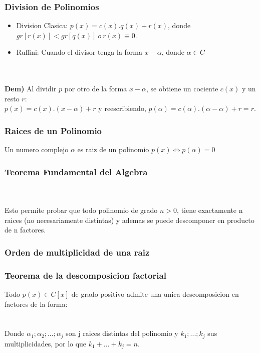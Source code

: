 \documentclass[10pt]{article}
\begin{document}
\subsubsection{Division de Polinomios}
\begin{itemize}
\item Division Clasica: $p(x)=c(x).q(x)+r(x)$, donde $gr[r(x)] < gr[q(x)]\ o\ r(x) \equiv 0$.
\item Ruffini: Cuando el divisor tenga la forma $x-\alpha$, donde $\alpha \in C$
\end{itemize}
\\ \\
\textbf{Dem)} Al dividir $p$ por otro de la forma $x-\alpha$, se obtiene un cociente $c(x)$ y un resto $r$:\\
$p(x) = c(x).(x-\alpha)+r$ y reescribiendo, $p(\alpha) = c(\alpha) . (\alpha - \alpha) + r = r$.
\subsubsection{Raices de un Polinomio}
Un numero complejo $\alpha$ es raiz de un polinomio $p(x) \iff p(\alpha)=0$\\
\subsubsection{Teorema Fundamental del Algebra}
\\ \\
Esto permite probar que todo polinomio de grado $n>0$, tiene exactamente n raices (no necesariamente distintas) y ademas se puede descomponer en producto de n factores.
\subsubsection{Orden de multiplicidad de una raiz}
\subsubsection{Teorema de la descomposicion factorial}
Todo $p(x) \in C[x]$ de grado positivo admite una unica descomposicion en factores de la forma:\\
\\ \\
Donde $\alpha_1; \alpha_2; ...; \alpha_j$ son j raices distintas del polinomio y $k_1; ...; k_j$ sus multiplicidades, por lo que $k_1+...+k_j = n$.
\end{document}
